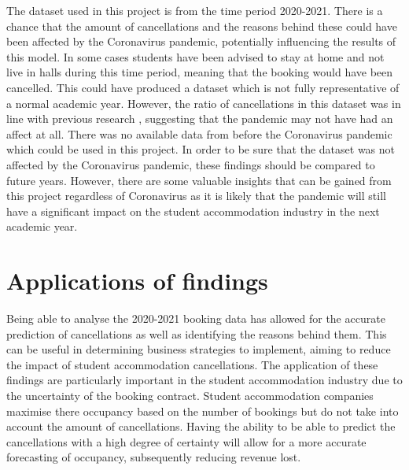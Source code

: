 \vspace{5mm}

The dataset used in this project is from the time period 2020-2021. There is a chance that the amount of cancellations and the reasons behind these could have been affected by the Coronavirus pandemic, potentially influencing the results of this model. In some cases students have been advised to stay at home and not live in halls during this time period, meaning that the booking would have been cancelled. This could have produced a dataset which is not fully representative of a normal academic year. However, the ratio of cancellations in this dataset was in line with previous research \cite{Antonio2017PredictingRevenue}, suggesting that the pandemic may not have had an affect at all. There was no available data from before the Coronavirus pandemic which could be used in this project. In order to be sure that the dataset was not affected by the Coronavirus pandemic, these findings should be compared to future years. However, there are some valuable insights that can be gained from this project regardless of Coronavirus as it is likely that the pandemic will still have a significant impact on the student accommodation industry in the next academic year. 
 
\section{Applications of findings}

Being able to analyse the 2020-2021 booking data has allowed for the accurate prediction of cancellations as well as identifying the reasons behind them. This can be useful in determining business strategies to implement, aiming to reduce the impact of student accommodation cancellations. The application of these findings are particularly important in the student accommodation industry due to the uncertainty of the booking contract. Student accommodation companies maximise there occupancy based on the number of bookings but do not take into account the amount of cancellations. Having the ability to be able to predict the cancellations with a high degree of certainty will allow for a more accurate forecasting of occupancy, subsequently reducing revenue lost. 

\vspace{5mm}

